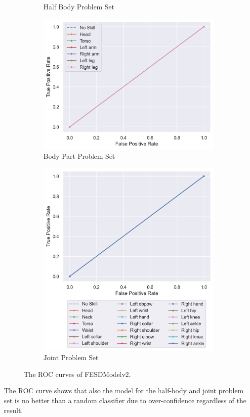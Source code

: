 \begin{figure}
\begin{subfigure}[b]{0.47\linewidth}
      \caption[]{Half Body Problem Set}
      \label{fig:hb_roc_v2}
  \end{subfigure}
  \hfill
  \begin{subfigure}[b]{0.47\linewidth}
      \centering
      \includegraphics[width=\textwidth]{figures/Results/v2_bs_40_is_64_e_100/bp/roc.png}
      \caption[]{Body Part Problem Set}
      \label{fig:bp_roc_v2}
  \end{subfigure}
  \hfill
  \begin{subfigure}[b]{0.47\linewidth}
      \centering
      \includegraphics[width=\textwidth]{figures/Results/v2_bs_40_is_64_e_100/jt/roc.png}
      \caption[]{Joint Problem Set}
      \label{fig:jt_roc_v2}
  \end{subfigure}
  \caption[ROC Curves of FESDModelv2]{The ROC curves of FESDModelv2.}
  \label{fig:roc_v2}
\end{figure}

The ROC curve shows that also the model for the half-body and joint problem set is no better than a random classifier due to over-confidence regardless of the result.